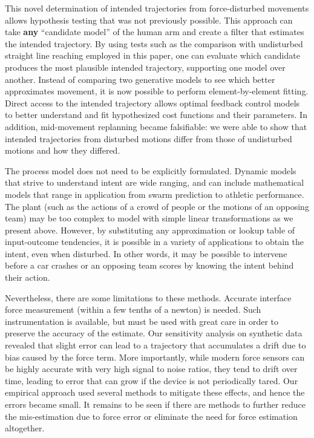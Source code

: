 This novel determination of intended trajectories from force-disturbed movements allows hypothesis testing that was not previously possible. This approach can take \textbf{any} ``candidate model'' of the human arm and create a filter that estimates the intended trajectory. By using tests such as the comparison with undisturbed straight line reaching employed in this paper, one can evaluate which candidate produces the most plausible intended trajectory, supporting one model over another.  Instead of comparing two generative models to see which better approximates movement, it is now possible to perform element-by-element fitting. Direct access to the intended trajectory allows optimal feedback control models to better understand and fit hypothesized cost functions and their parameters. In addition, mid-movement replanning became falsifiable: we were able to show that intended trajectories from disturbed motions differ from those of undisturbed motions and how they differed.

The process model does not need to be explicitly formulated. Dynamic models that strive to understand intent are wide ranging, and can include mathematical models that range in application from swarm prediction to athletic performance. The plant (such as the actions of a crowd of people or the motions of an opposing team) may be too complex to model with simple linear transformations as we present above. However, by substituting any approximation or lookup table of input-outcome tendencies, it is possible in a variety of applications to obtain the intent, even when disturbed. In other words, it may be possible to intervene before a car crashes or an opposing team scores by knowing the intent behind their action.

Nevertheless, there are some limitations to these methods. Accurate interface force measurement (within a few tenths of a newton) is needed. Such instrumentation is available, but must be used with great care in order to preserve the accuracy of the estimate. Our sensitivity analysis on synthetic data revealed that slight error can lead to a trajectory that accumulates a drift due to bias caused by the force term. More importantly, while modern force sensors can be highly accurate with very high signal to noise ratios, they tend to drift over time, leading to error that can grow if the device is not periodically tared. Our empirical approach used several methods to mitigate these effects, and hence the errors became small. It remains to be seen if there are methods to further reduce the mis-estimation due to force error or eliminate the need for force estimation altogether.  

